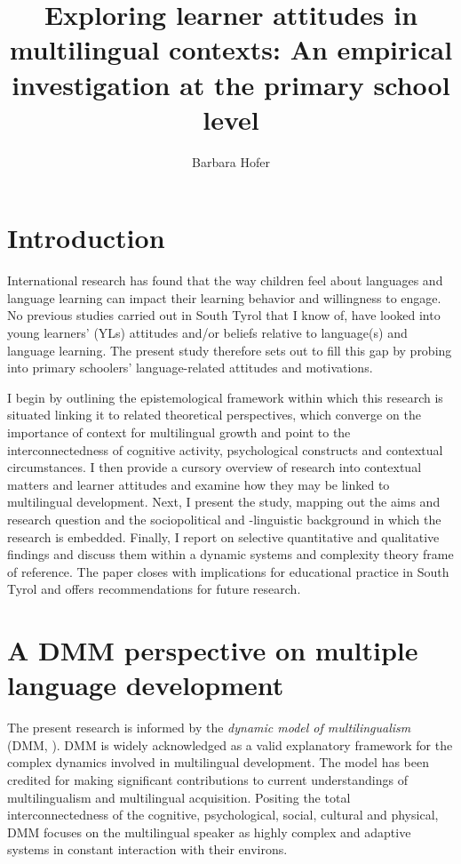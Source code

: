 \documentclass[output=paper]{../langscibook}
\author{Barbara Hofer\affiliation{Dyme Research Group, Innsbruck University}}
\title{Exploring learner attitudes in multilingual contexts: An empirical investigation at the primary school level}
\begin{document}
\maketitle 
{}





\section{Introduction}

International research has found that the way children feel about languages and language learning can impact their learning behavior and willingness to engage. No previous studies carried out in South Tyrol that I know of, have looked into young learners’ (YLs) attitudes and/or beliefs relative to language(s) and language learning. The present study therefore sets out to fill this gap by probing into primary schoolers’ language-related attitudes and motivations. 

I begin by outlining the epistemological framework within which this research is situated linking it to related theoretical perspectives, which converge on the importance of context for multilingual growth and point to the interconnectedness of cognitive activity, psychological constructs and contextual circumstances. I then provide a cursory overview of research into contextual matters and learner attitudes and examine how they may be linked to multilingual development. Next, I present the study, mapping out the aims and research question and the sociopolitical and -linguistic background in which the research is embedded. Finally, I report on selective quantitative and qualitative findings and discuss them within a dynamic systems and complexity theory frame of reference. The paper closes with implications for educational practice in South Tyrol and offers recommendations for future research.


\section{A DMM perspective on multiple language development}


The present research is informed by the \emph{dynamic model of multilingualism} (DMM, \citealt{HerdinaJessner2002}). DMM is widely acknowledged as a valid explanatory framework for the complex dynamics involved in multilingual development. The model has been credited for making significant contributions to current understandings of multilingualism and multilingual acquisition. Positing the total interconnectedness of the cognitive, psychological, social, cultural and physical, DMM focuses on the multilingual speaker as highly complex and adaptive systems in constant interaction with their environs. 
\end{document}
